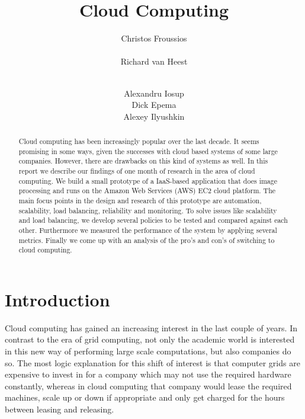 \documentclass{stylesheet}
\begin{document}
\title{Cloud Computing}

\author{
\alignauthor
Christos Froussios\\
	\\
\alignauthor
Richard van Heest\\
	\\
\and
\alignauthor
Alexandru Iosup\\
\alignauthor
Dick Epema\\
\alignauthor
Alexey Ilyushkin\\
}

\maketitle

\begin{abstract}
Cloud computing has been increasingly popular over the last decade. It seems promising in some ways, given the successes with cloud based systems of some large companies. However, there are drawbacks on this kind of systems as well. In this report we describe our findings of one month of research in the area of cloud computing. We build a small prototype of a IaaS-based application that does image processing and runs on the Amazon Web Services (AWS) EC2 cloud platform. The main focus points in the design and research of this prototype are automation, scalability, load balancing, reliability and monitoring. To solve issues like scalability and load balancing, we develop several policies to be tested and compared against each other. Furthermore we measured the performance of the system by applying several metrics. Finally we come up with an analysis of the pro's and con's of switching to cloud computing.
\end{abstract}

\section{Introduction}
Cloud computing has gained an increasing interest in the last couple of years. In contrast to the era of grid computing, not only the academic world is interested in this new way of performing large scale computations, but also companies do so. The most logic explanation for this shift of interest is that computer grids are expensive to invest in for a company which may not use the required hardware constantly, whereas in cloud computing that company would lease the required machines, scale up or down if appropriate and only get charged for the hours between leasing and releasing.
\end{document}
